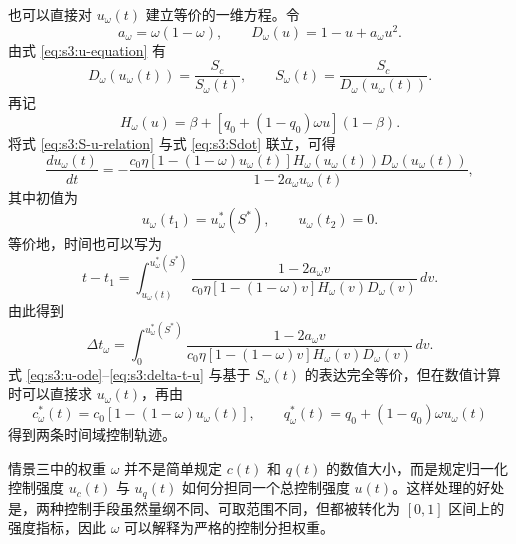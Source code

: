 也可以直接对 $u_\omega(t)$ 建立等价的一维方程。令
\begin{equation}
a_\omega=\omega(1-\omega),
\qquad
D_\omega(u)=1-u+a_\omega u^2.
\end{equation}
由式 \eqref{eq:s3:u-equation} 有
\begin{equation}
D_\omega(u_\omega(t))
=
\frac{S_c}{S_\omega(t)},
\qquad
S_\omega(t)=\frac{S_c}{D_\omega(u_\omega(t))}.
\label{eq:s3:S-u-relation}
\end{equation}
再记
\begin{equation}
H_\omega(u)
=
\beta+\left[q_0+(1-q_0)\omega u\right](1-\beta).
\end{equation}
将式 \eqref{eq:s3:S-u-relation} 与式 \eqref{eq:s3:Sdot} 联立，可得
\begin{equation}
\frac{du_\omega(t)}{dt}
=
-
\frac{
c_0\eta
\left[1-(1-\omega)u_\omega(t)\right]
H_\omega(u_\omega(t))
D_\omega(u_\omega(t))
}
{
1-2a_\omega u_\omega(t)
},
\label{eq:s3:u-ode}
\end{equation}
其中初值为
\begin{equation}
u_\omega(t_1)=u_\omega^*(S^*),
\qquad
u_\omega(t_2)=0.
\end{equation}
等价地，时间也可以写为
\begin{equation}
t-t_1
=
\int_{u_\omega(t)}^{u_\omega^*(S^*)}
\frac{
1-2a_\omega v
}
{
c_0\eta
\left[1-(1-\omega)v\right]
H_\omega(v)
D_\omega(v)
}\,dv.
\label{eq:s3:u-implicit}
\end{equation}
由此得到
\begin{equation}
\Delta t_\omega
=
\int_{0}^{u_\omega^*(S^*)}
\frac{
1-2a_\omega v
}
{
c_0\eta
\left[1-(1-\omega)v\right]
H_\omega(v)
D_\omega(v)
}\,dv.
\label{eq:s3:delta-t-u}
\end{equation}
式 \eqref{eq:s3:u-ode}--\eqref{eq:s3:delta-t-u} 与基于 $S_\omega(t)$ 的表达完全等价，但在数值计算时可以直接求 $u_\omega(t)$，再由
\begin{equation}
c_\omega^*(t)=c_0[1-(1-\omega)u_\omega(t)],
\qquad
q_\omega^*(t)=q_0+(1-q_0)\omega u_\omega(t)
\end{equation}
得到两条时间域控制轨迹。

\begin{remark}
情景三中的权重 $\omega$ 并不是简单规定 $c(t)$ 和 $q(t)$ 的数值大小，而是规定归一化控制强度 $u_c(t)$ 与 $u_q(t)$ 如何分担同一个总控制强度 $u(t)$。这样处理的好处是，两种控制手段虽然量纲不同、可取范围不同，但都被转化为 $[0,1]$ 区间上的强度指标，因此 $\omega$ 可以解释为严格的控制分担权重。
\end{remark}
